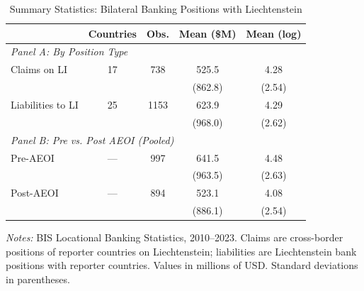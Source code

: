 \begin{table}[t]
\centering
\caption{Summary Statistics: Bilateral Banking Positions with Liechtenstein}
\label{tab:summary}
\begin{tabular}{lcccc}
\hline\hline
 & Countries & Obs. & Mean (\$M) & Mean (log) \\
\hline
\multicolumn{5}{l}{\textit{Panel A: By Position Type}} \\
Claims on LI & 17 & 738 & 525.5 & 4.28 \\
 & & & (862.8) & (2.54) \\
Liabilities to LI & 25 & 1153 & 623.9 & 4.29 \\
 & & & (968.0) & (2.62) \\
\hline
\multicolumn{5}{l}{\textit{Panel B: Pre vs. Post AEOI (Pooled)}} \\
Pre-AEOI & --- & 997 & 641.5 & 4.48 \\
 & & & (963.5) & (2.63) \\
Post-AEOI & --- & 894 & 523.1 & 4.08 \\
 & & & (886.1) & (2.54) \\
\hline\hline
\end{tabular}
\begin{tablenotes}
\item \textit{Notes:} BIS Locational Banking Statistics, 2010--2023. Claims are cross-border positions of reporter countries on Liechtenstein; liabilities are Liechtenstein bank positions with reporter countries. Values in millions of USD. Standard deviations in parentheses.
\end{tablenotes}
\end{table}

